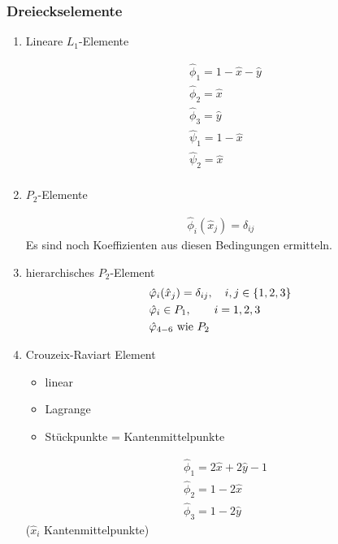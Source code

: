 \subsubsection{Dreieckselemente}
\begin{enumerate}
\item Lineare $L_1$-Elemente

  \begin{align*}
&    \hat \phi_1 = 1 - \hat x - \hat y\\
&    \hat \phi_2 = \hat x\\
&    \hat \phi_3 = \hat y\\
&    \hat \psi_1 = 1-\hat x\\
&    \hat \psi_2 = \hat x\\
  \end{align*}
\item $P_2$-Elemente

  \begin{align*}
    \hat \phi_i(\hat x _j) = \delta_{ij}
  \end{align*}
Es sind noch Koeffizienten aus diesen Bedingungen ermitteln. 
\item hierarchisches $P_2$-Element
  \begin{align*}
    & \hat {\varphi}_i(\hat x _j) = \delta_{ij}, \quad i, j \in \left\{ 1, 2, 3 \right\}\\
    & \hat {\varphi}_i \in P_1, \qquad i = 1, 2, 3\\
    & \hat {\varphi}_{4 - 6} \text{ wie } P_2
  \end{align*}
\item Crouzeix-Raviart Element
  
  \begin{itemize}
  \item linear
  \item Lagrange
  \item Stückpunkte = Kantenmittelpunkte
  \end{itemize}   
  \begin{align*}
    & \hat \phi _1 = 2 \hat x + 2 \hat y - 1\\
    & \hat \phi _2 = 1 - 2 \hat x\\
    & \hat \phi _3 = 1 - 2 \hat y
    \end{align*}
    ($\hat x_i$ Kantenmittelpunkte)
\end{enumerate}
